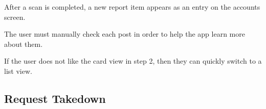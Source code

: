 \begin{figure}
\begin{minipage}{4.6cm}
    \caption{}
    \label{fig:ui_report_list_mode_step3}
  \end{minipage}
\end{figure}

\begin{minipage}{\textwidth}
  \centering
  \begin{minipage}[t]{4.6cm}
    \vspace{0pt}
    \centering
    \begin{minipage}{4.4cm}
      After a scan is completed, a new report item appears as an entry on the accounts screen.
    \end{minipage}
  \end{minipage}
  \begin{minipage}[t]{4.6cm}
    \vspace{0pt}
    \centering
    \begin{minipage}{4.4cm}
      The user must manually check each post in order to help the app learn more about them.
    \end{minipage}
  \end{minipage}
  \begin{minipage}[t]{4.6cm}
    \vspace{0pt}
    \centering
    \begin{minipage}{4.4cm}
      If the user does not like the card view in step 2, then they can quickly switch to a list view.
    \end{minipage}
  \end{minipage}
\end{minipage}

\clearpage

\subsection{Request Takedown}

